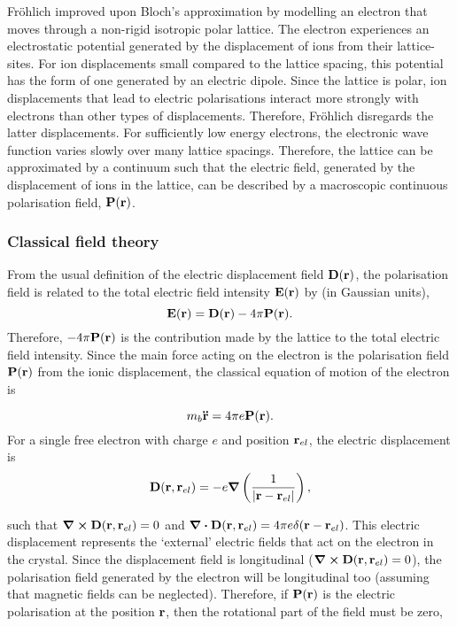 Fr\"ohlich improved upon Bloch's approximation by modelling an electron that moves through a non-rigid isotropic polar lattice. The electron experiences an electrostatic potential generated by the displacement of ions from their lattice-sites. For ion displacements small compared to the lattice spacing, this potential has the form of one generated by an electric dipole. Since the lattice is polar, ion displacements that lead to electric polarisations interact more strongly with electrons than other types of displacements. Therefore, Fr\"ohlich disregards the latter displacements. For sufficiently low energy electrons, the electronic wave function varies slowly over many lattice spacings. Therefore, the lattice can be approximated by a continuum such that the electric field, generated by the displacement of ions in the lattice, can be described by a macroscopic continuous polarisation field, $\vb{P}(\vb{r})$. 

\subsubsection{Classical field theory}

From the usual definition of the electric displacement field $\vb{D}(\vb{r})$, the polarisation field is related to the total electric field intensity $\vb{E}(\vb{r})$ by (in Gaussian units),
\begin{equation}
    \vb{E}(\vb{r}) = \vb{D}(\vb{r}) - 4\pi\vb{P}(\vb{r}).
\end{equation}
Therefore, $-4\pi\vb{P}(\vb{r})$ is the contribution made by the lattice to the total electric field intensity. Since the main force acting on the electron is the polarisation field $\vb{P}(\vb{r})$ from the ionic displacement, the classical equation of motion of the electron is

\begin{equation}
    m_b \vb{\ddot{r}} = 4\pi e \vb{P}(\vb{r}).
\end{equation}
For a single free electron with charge $e$ and position $\vb{r}_{el}$, the electric displacement is
\begin{equation}
    \vb{D}(\vb{r}, \vb{r}_{el}) = -e \grad \left(\frac{1}{\abs{\vb{r} - \vb{r}_{el}}}\right),
\end{equation}

such that $\curl \vb{D}(\vb{r}, \vb{r}_{el}) = 0$ and $\div \vb{D}(\vb{r}, \vb{r}_{el}) = 4\pi e \delta (\vb{r} - \vb{r}_{el})$. This electric displacement represents the `external' electric fields that act on the electron in the crystal. Since the displacement field is longitudinal ($\curl \vb{D}(\vb{r}, \vb{r}_{el}) = 0$), the polarisation field generated by the electron will be longitudinal too (assuming that magnetic fields can be neglected). Therefore, if $\vb{P}(\vb{r})$ is the electric polarisation at the position $\vb{r}$, then the rotational part of the field must be zero,

